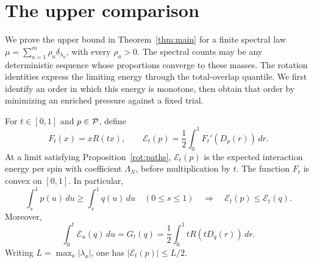 \section{The upper comparison}\label{sec:upper}

We prove the upper bound in Theorem~\ref{thm:main} for a finite
spectral law
\(\mu=\sum_{a=1}^m\rho_a\delta_{\lambda_a}\), with every
\(\rho_a>0\). The spectral counts may be any deterministic sequence
whose proportions converge to these masses. The rotation identities
express the limiting energy through the total-overlap quantile. We
first identify an order in which this energy is monotone, then obtain
that order by minimizing an enriched pressure against a fixed trial.

\begin{lemma}\label{up:energy}
For \(t\in[0,1]\) and \(p\in\mathcal P\), define
\[
 F_t(x)=xR(tx),\qquad
 \mathcal E_t(p)=\frac12\int_0^1F_t'(D_p(r))\,dr.
\]
At a limit satisfying Proposition~\ref{rot:paths},
\(\mathcal E_t(p)\) is the expected interaction energy per spin
with coefficient \(\Lambda_N\), before multiplication by \(t\).
The function \(F_t\) is convex on \([0,1]\). In particular,
\begin{equation}\label{up:tail-order}
 \int_s^1p(u)\,du\ge\int_s^1q(u)\,du
 \quad(0\le s\le1)
 \quad\Longrightarrow\quad
 \mathcal E_t(p)\le\mathcal E_t(q).
\end{equation}
Moreover,
\begin{equation}\label{up:primitive}
 \int_0^t\mathcal E_u(q)\,du
 =G_t(q)=\frac12\int_0^1tR(tD_q(r))\,dr.
\end{equation}
Writing \(L=\max_a|\lambda_a|\), one has
\(\lvert\mathcal E_t(p)\rvert\le L/2\).
\end{lemma}

